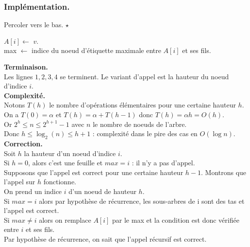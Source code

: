 \documentclass[french, 11pt]{article}
\begin{document}
\subsubsection{Implémentation.}

\begin{defi}{Percoler vers le bas. $\star$}{}
    \hspace*{0.2cm}\begin{algorithm}[H]
        \LinesNumbered
        \caption{Percoler vers le bas}
        $A[i] \gets$ $v$.\\
        max $\gets$ indice du noeud d'étiquette maximale entre $A[i]$ et ses fils.\\
    \end{algorithm}\vspace{0.25cm}
    \textbf{Terminaison.}\\
    Les lignes $1,2,3,4$ se terminent. Le variant d'appel est la hauteur du noeud d'indice $i$.\\
    \textbf{Complexité.}\\
    Notons $T(h)$ le nombre d'opérations élémentaires pour une certaine hauteur $h$.\\
    On a $T(0) = \alpha$ et $T(h) = \alpha + T(h-1)$ donc $T(h) = \alpha h = O(h)$.\\
    Or $2^h \leq n \leq 2^{h+1}-1$ avec $n$ le nombre de noeuds de l'arbre.\\
    Donc $h \leq \log_2(n) \leq h+1$ : complexité dans le pire des cas en $O(\log n)$.\\
    \textbf{Correction.}\\
    Soit $h$ la hauteur d'un noeud d'indice $i$.\\
    Si $h=0$, alors c'est une feuille et $max = i$ : il n'y a pas d'appel.\\
    Supposons que l'appel est correct pour une certaine hauteur $h-1$. Montrons que l'appel sur $h$ fonctionne.\\
    On prend un indice $i$ d'un noeud de hauteur $h$.\\
    Si $max = i$ alors par hypothèse de récurrence, les sous-arbres de i sont des tas et l'appel est correct.\\
    Si $max \neq i$ alors on remplace $A[i]$ par le max et la condition est donc vérifiée entre $i$ et ses fils.\\
    Par hypothèse de récurrence, on sait que l'appel récursif est correct.
\end{defi}
\end{document}

